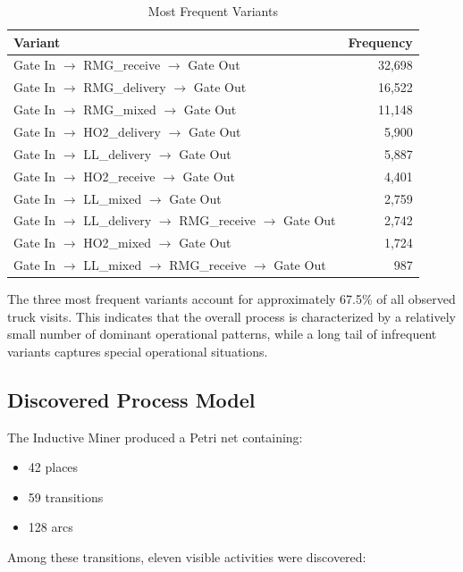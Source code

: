 \begin{table}[H]
\centering
\caption{Most Frequent Variants}
\label{tab:topvariants}
\begin{tabular}{lr}
\hline
Variant & Frequency\\
\hline
Gate In $\rightarrow$ RMG\_receive $\rightarrow$ Gate Out & 32,698\\
Gate In $\rightarrow$ RMG\_delivery $\rightarrow$ Gate Out & 16,522\\
Gate In $\rightarrow$ RMG\_mixed $\rightarrow$ Gate Out & 11,148\\
Gate In $\rightarrow$ HO2\_delivery $\rightarrow$ Gate Out & 5,900\\
Gate In $\rightarrow$ LL\_delivery $\rightarrow$ Gate Out & 5,887\\
Gate In $\rightarrow$ HO2\_receive $\rightarrow$ Gate Out & 4,401\\
Gate In $\rightarrow$ LL\_mixed $\rightarrow$ Gate Out & 2,759\\
Gate In $\rightarrow$ LL\_delivery $\rightarrow$ RMG\_receive $\rightarrow$ Gate Out & 2,742\\
Gate In $\rightarrow$ HO2\_mixed $\rightarrow$ Gate Out & 1,724\\
Gate In $\rightarrow$ LL\_mixed $\rightarrow$ RMG\_receive $\rightarrow$ Gate Out & 987\\
\hline
\end{tabular}
\end{table}

The three most frequent variants account for approximately 67.5\% of all observed truck visits. This indicates that the overall process is characterized by a relatively small number of dominant operational patterns, while a long tail of infrequent variants captures special operational situations.

\subsection{Discovered Process Model}

The Inductive Miner produced a Petri net containing:

\begin{itemize}
\item 42 places
\item 59 transitions
\item 128 arcs
\end{itemize}

Among these transitions, eleven visible activities were discovered:


